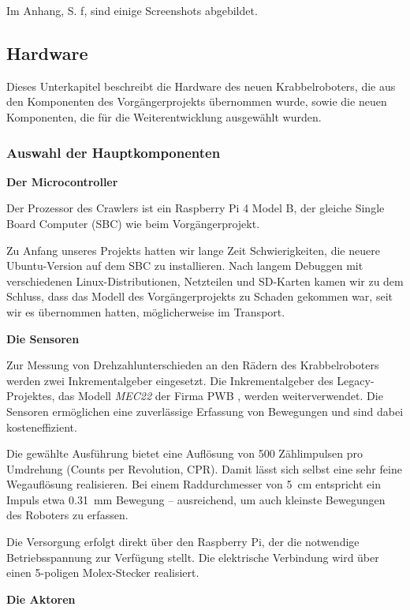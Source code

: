 Im Anhang, S. \pageref{fig:webinterface_screenshots}f, sind einige Screenshots abgebildet.

\subsection{Hardware}

Dieses Unterkapitel beschreibt die Hardware des neuen Krabbelroboters, die aus den Komponenten des Vorgängerprojekts übernommen wurde, sowie die neuen Komponenten, die für die Weiterentwicklung ausgewählt wurden.

\subsubsection{Auswahl der Hauptkomponenten}

\textbf{Der Microcontroller}

Der Prozessor des Crawlers ist ein Raspberry Pi 4 Model B, der gleiche Single Board Computer (SBC) wie beim Vorgängerprojekt.

Zu Anfang unseres Projekts hatten wir lange Zeit Schwierigkeiten, die neuere Ubuntu-Version auf dem SBC zu installieren. Nach langem Debuggen mit verschiedenen Linux-Distributionen, Netzteilen und SD-Karten kamen wir zu dem Schluss, dass das Modell des Vorgängerprojekts zu Schaden gekommen war, seit wir es übernommen hatten, möglicherweise im Transport.

\textbf{Die Sensoren}

Zur Messung von Drehzahlunterschieden an den Rädern des Krabbelroboters werden zwei Inkrementalgeber eingesetzt. Die Inkrementalgeber des Legacy-Projektes, das Modell \textit{MEC22} der Firma PWB \cite{pwb_me16_datasheet_2011}, werden weiterverwendet. Die Sensoren ermöglichen eine zuverlässige Erfassung von Bewegungen und sind dabei kosteneffizient.

Die gewählte Ausführung bietet eine Auflösung von 500 Zählimpulsen pro Umdrehung (Counts per Revolution, CPR). Damit lässt sich selbst eine sehr feine Wegauflösung realisieren. Bei einem Raddurchmesser von \qty{5}{\centi\m} entspricht ein Impuls etwa \qty{0,31}{\milli\m} Bewegung – ausreichend, um auch kleinste Bewegungen des Roboters zu erfassen.

Die Versorgung erfolgt direkt über den Raspberry Pi, der die notwendige Betriebsspannung zur Verfügung stellt. Die elektrische Verbindung wird über einen 5-poligen Molex-Stecker realisiert.

\textbf{Die Aktoren}

